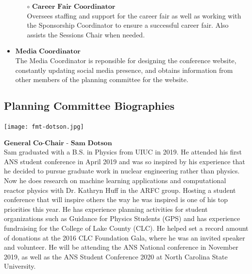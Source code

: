 \begin{itemize}
\begin{itemize}
		\item[$\circ$] $\textbf{Career Fair Coordinator}$\\
		Oversees staffing and support for the career fair as well as working with the Sponsorship
		Coordinator to ensure a successful career fair. Also assists the Sessions Chair when needed.
	\end{itemize}
	\item $\textbf{Media Coordinator}$\\
		The Media Coordinator is reponsible for designing the conference website, constantly updating social media presence,
		and obtains information from other members of the planning committee for the website. 
\end{itemize}

\newpage
\subsection{Planning Committee Biographies}

\begin{minipage}{0.25\textwidth}
	\centering
	\texttt{[image: fmt-dotson.jpg]}
\end{minipage}
\begin{minipage}{0.73\textwidth}
	$\textbf{General Co-Chair - Sam Dotson}$\\
Sam graduated with a B.S. in Physics from UIUC in 2019. He attended his first ANS student conference in April 2019 and was so inspired by his experience that he decided to pursue graduate work in nuclear engineering rather than physics. Now he does research on machine learning applications and computational reactor physics with Dr. Kathryn Huff in the ARFC group. Hosting a student conference that will inspire others the way he was inspired is one of his top priorities this year. He has experience planning activities for student organizations such as Guidance for Physics Students (GPS) and has experience fundraising for the College of Lake County (CLC). He helped set a record amount of donations at the 2016 CLC Foundation Gala, where he was an invited speaker and volunteer. He will be attending the ANS National conference in November 2019, as well as the ANS Student Conference 2020 at North Carolina State University.
\end{minipage}

